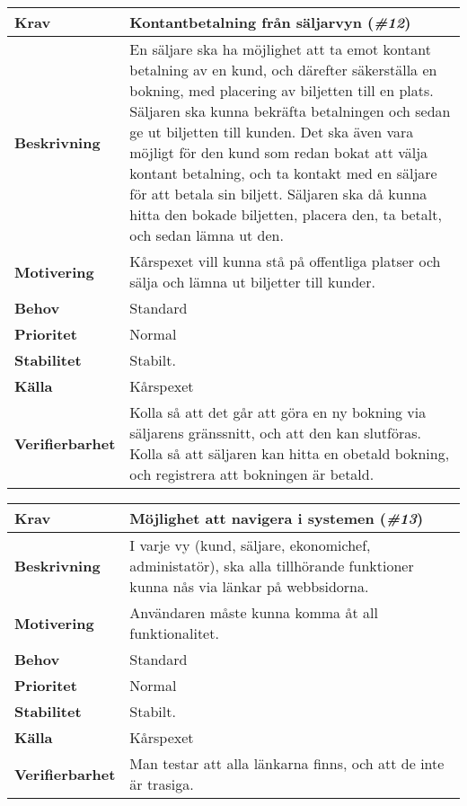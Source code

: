\documentclass[a4paper, twoside, 11pt, titlepage]{article}
\begin{document}
	\begin{tabular} { p{2.6cm} p{12.5cm} }
		\hline
		\sffamily\textbf{Krav} & Kontantbetalning från säljarvyn (\emph{\#12})  \\
		\hline
		\sffamily\textbf{Beskrivning} & En säljare ska ha möjlighet att ta emot kontant betalning av en kund, och därefter säkerställa en bokning, med placering av biljetten till en plats. Säljaren ska kunna bekräfta betalningen och sedan ge ut biljetten till kunden. Det ska även vara möjligt för den kund som redan bokat att välja kontant betalning, och ta kontakt med en säljare för att betala sin biljett. Säljaren ska då kunna hitta den bokade biljetten, placera den, ta betalt, och sedan lämna ut den.  \\
		\hline
		\sffamily\textbf{Motivering} & Kårspexet vill kunna stå på offentliga platser och sälja och lämna ut biljetter till kunder.  \\
		\hline
		\sffamily\textbf{Behov} & Standard  \\
		\hline
		\sffamily\textbf{Prioritet} & Normal  \\
		\hline
		\sffamily\textbf{Stabilitet} & Stabilt.  \\
		\hline
		\sffamily\textbf{Källa} & Kårspexet  \\
		\hline
		\sffamily\textbf{Verifierbarhet} & Kolla så att det går att göra en ny bokning via säljarens gränssnitt, och att den kan slutföras. Kolla så att säljaren kan hitta en obetald bokning, och registrera att bokningen är betald.  \\
		\hline
	\end{tabular}
	\vspace{6mm}

	\begin{tabular} { p{2.6cm} p{12.5cm} }
		\hline
		\sffamily\textbf{Krav} & Möjlighet att navigera i systemen (\emph{\#13})  \\
		\hline
		\sffamily\textbf{Beskrivning} & I varje vy (kund, säljare, ekonomichef, administatör), ska alla tillhörande funktioner kunna nås via länkar på webbsidorna.  \\
		\hline
		\sffamily\textbf{Motivering} & Användaren måste kunna komma åt all funktionalitet.  \\
		\hline
		\sffamily\textbf{Behov} & Standard  \\
		\hline
		\sffamily\textbf{Prioritet} & Normal  \\
		\hline
		\sffamily\textbf{Stabilitet} & Stabilt.  \\
		\hline
		\sffamily\textbf{Källa} & Kårspexet  \\
		\hline
		\sffamily\textbf{Verifierbarhet} & Man testar att alla länkarna finns, och att de inte är trasiga.  \\
		\hline
	\end{tabular}
	\vspace{6mm}
\end{document}
